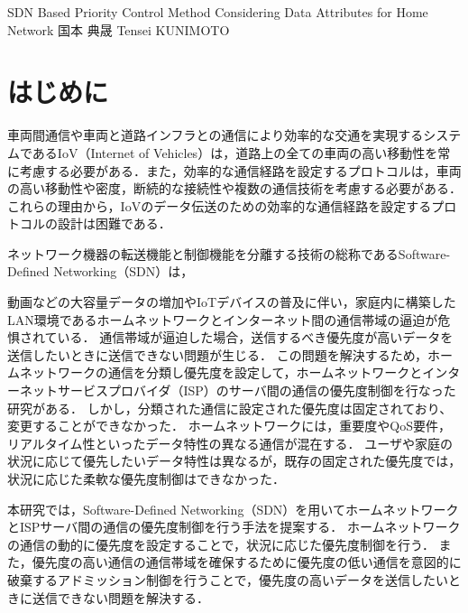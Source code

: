 \documentclass[a4paper,10pt,twocolumn,uplatex]{jsarticle}
\date{8}
\begin{document}
{SDN Based Priority Control Method Considering Data Attributes for Home Network}
{国本 典晟}
{Tensei KUNIMOTO}

\section{はじめに}
車両間通信や車両と道路インフラとの通信により効率的な交通を実現するシステムであるIoV（Internet of Vehicles）は，道路上の全ての車両の高い移動性を常に考慮する必要がある．また，効率的な通信経路を設定するプロトコルは，車両の高い移動性や密度，断続的な接続性や複数の通信技術を考慮する必要がある．これらの理由から，IoVのデータ伝送のための効率的な通信経路を設定するプロトコルの設計は困難である．\par
ネットワーク機器の転送機能と制御機能を分離する技術の総称であるSoftware-Defined Networking（SDN）は，

動画などの大容量データの増加やIoTデバイスの普及に伴い，家庭内に構築したLAN環境であるホームネットワークとインターネット間の通信帯域の逼迫が危惧されている\cite{ガイドライン}．
通信帯域が逼迫した場合，送信するべき優先度が高いデータを送信したいときに送信できない問題が生じる．
この問題を解決するため，ホームネットワークの通信を分類し優先度を設定して，ホームネットワークとインターネットサービスプロバイダ（ISP）のサーバ間の通信の優先度制御を行なった研究がある\cite{AQRA}．
しかし，分類された通信に設定された優先度は固定されており、変更することができなかった．
ホームネットワークには，重要度やQoS要件，リアルタイム性といったデータ特性の異なる通信が混在する．
ユーザや家庭の状況に応じて優先したいデータ特性は異なるが，既存の固定された優先度では，状況に応じた柔軟な優先度制御はできなかった．\par
本研究では，Software-Defined Networking（SDN）を用いてホームネットワークとISPサーバ間の通信の優先度制御を行う手法を提案する．
ホームネットワークの通信の動的に優先度を設定することで，状況に応じた優先度制御を行う．
また，優先度の高い通信の通信帯域を確保するために優先度の低い通信を意図的に破棄するアドミッション制御を行うことで，優先度の高いデータを送信したいときに送信できない問題を解決する．
\end{document}
